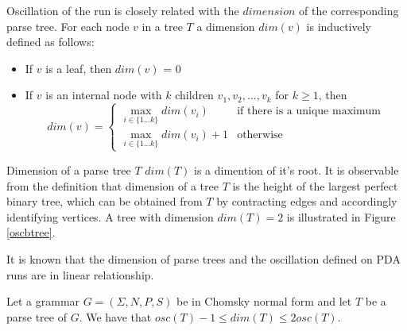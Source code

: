 Oscillation of the run is closely related with the $dimension$ of the corresponding parse tree. For each node $v$ in a tree $T$ a dimension $dim(v)$ is inductively defined as follows:
\begin{itemize}
\item If $v$ is a leaf, then $dim(v)$ = 0
\item If $v$ is an internal node with $k$ children $v_1, v_2, ..., v_k$ for $k \ge 1$, then 
\begin{equation}
dim(v) = 
 \begin{cases}
   \max_{i \in \{1...k\}}dim(v_i) &\text{if there is a unique maximum}\\
   \max_{i \in \{1...k\}}dim(v_i)+1 &\text{otherwise}
 \end{cases}
\end{equation}
\end{itemize}


Dimension of a parse tree $T$ $dim(T)$ is a dimention of it's root.  It is observable from the definition that dimension of a tree $T$ is the height of the largest perfect binary tree, which can be obtained from $T$ by contracting edges and accordingly identifying vertices. A tree with dimension $dim(T) = 2$ is illustrated in Figure \ref{oscbtree}.


It is known that the dimension of parse trees and the oscillation defined on PDA runs are in linear relationship.

\begin{lemma}
Let a grammar $G = (\Sigma, N, P, S)$ be in Chomsky normal form and let $T$ be a parse tree of $G$. We have that $osc(T) - 1 \le dim(T) \le 2osc(T)$.
\end{lemma}

